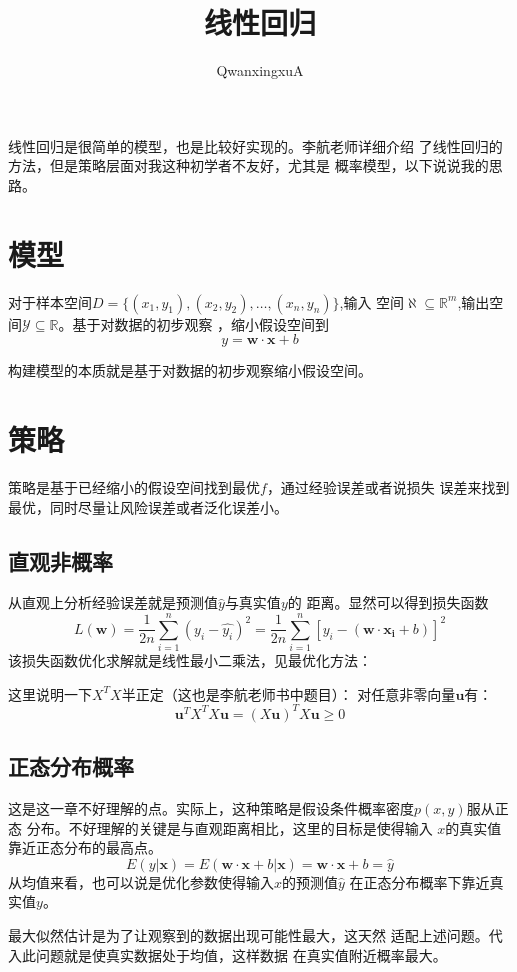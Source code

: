 \documentclass{article}
\title{线性回归}
\author{QwanxingxuA}
\begin{document}
\maketitle
线性回归是很简单的模型，也是比较好实现的。李航老师详细介绍
了线性回归的方法，但是策略层面对我这种初学者不友好，尤其是
概率模型，以下说说我的思路。

\section{模型}
对于样本空间$D=\{(x_1,y_1),(x_2,y_2),\dots,(x_n,y_n)\}$,输入
空间$\aleph\subseteq \mathbb{R}^m $,输出空间$\mathcal{Y}\subseteq \mathbb{R}$。基于对数据的初步观察
，缩小假设空间到\[y=\boldsymbol{w}\cdot \boldsymbol{x}+b\]

构建模型的本质就是基于对数据的初步观察缩小假设空间。

\section{策略}
策略是基于已经缩小的假设空间找到最优$f$，通过经验误差或者说损失
误差来找到最优，同时尽量让风险误差或者泛化误差小。
\subsection{直观非概率}
从直观上分析经验误差就是预测值$\widehat{y}$与真实值$y$的
距离。显然可以得到损失函数\[L(\boldsymbol{w})=\frac{1}{2n}\sum_{i=1}^{n}
(y_i-\widehat{y_i})^2=\frac{1}{2n}\sum_{i=1}^{n}
[y_i-(\boldsymbol{w}\cdot \boldsymbol{x_i}+b)]^2\]
该损失函数优化求解就是线性最小二乘法，见最优化方法：

这里说明一下$X^TX$半正定（这也是李航老师书中题目）：
对任意非零向量$\boldsymbol{u}$有：
\[\boldsymbol{u}^TX^TX\boldsymbol{u}=(X\boldsymbol{u})^TX\boldsymbol{u}\ge 0\]

\subsection{正态分布概率}
这是这一章不好理解的点。实际上，这种策略是假设条件概率密度$p(x,y)$服从正态
分布。不好理解的关键是与直观距离相比，这里的目标是使得输入
$x$的真实值靠近正态分布的最高点。
\[E(y|\boldsymbol{x})=E(\boldsymbol{w}\cdot \boldsymbol{x}+b|\boldsymbol{x})
=\boldsymbol{w}\cdot \boldsymbol{x}+b=\widehat{y}\]
从均值来看，也可以说是优化参数使得输入$x$的预测值$\widehat{y}$
在正态分布概率下靠近真实值$y$。

最大似然估计是为了让观察到的数据出现可能性最大，这天然
适配上述问题。代入此问题就是使真实数据处于均值，这样数据
在真实值附近概率最大。
\end{document}
